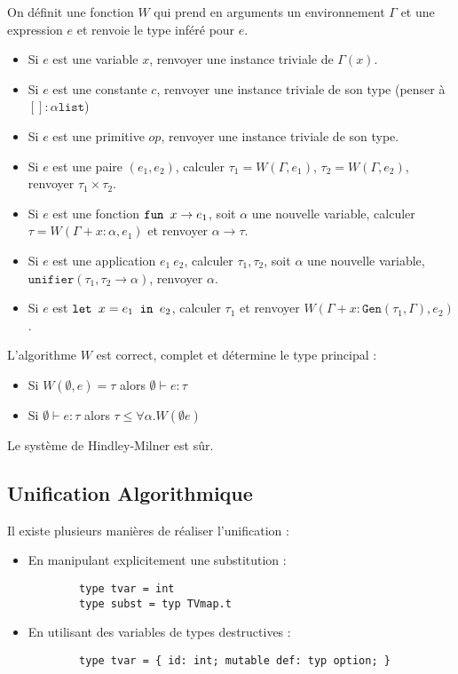 \documentclass{cours}
\begin{document}
On définit une fonction $W$ qui prend en arguments un environnement $\Gamma$ et une expression $e$ et renvoie le type inféré pour $e$.
\begin{itemize}
    \item Si $e$ est une variable $x$, renvoyer une instance triviale de $\Gamma(x)$.
    \item Si $e$ est une constante $c$, renvoyer une instance triviale de son type (penser à $\left[\right] : \alpha \texttt{list}$)
    \item Si $e$ est une primitive $op$, renvoyer une instance triviale de son type.
    \item Si $e$ est une paire $(e_{1}, e_{2})$, calculer $\tau_{1} = W(\Gamma, e_{1})$, $\tau_{2} = W\left(\Gamma, e_{2}\right)$, renvoyer $\tau_{1} \times \tau_{2}$.
    \item Si $e$ est une fonction $\texttt{fun } x \rightarrow e_{1}$, soit $\alpha$ une nouvelle variable, calculer $\tau = W(\Gamma + x : \alpha, e_{1})$ et renvoyer $\alpha \rightarrow \tau$.
    \item Si $e$ est une application $e_{1} \ e_{2}$, calculer $\tau_{1}, \tau_{2}$, soit $\alpha$ une nouvelle variable,  $\texttt{unifier}(\tau_{1}, \tau_{2} \rightarrow \alpha)$, renvoyer $\alpha$.
    \item Si $e$ est $\texttt{let } x = e_{1} \texttt{ in } e_{2}$, calculer $\tau_{1}$ et renvoyer $W(\Gamma + x : \texttt{Gen}(\tau_{1}, \Gamma), e_{2})$.
\end{itemize}

\begin{theorem}
    L'algorithme $W$ est correct, complet et détermine le type principal :
    \begin{itemize}
        \item Si $W(\emptyset, e) = \tau$ alors $\emptyset \vdash e : \tau$
        \item Si $\emptyset \vdash e : \tau$ alors $\tau \leq \forall \alpha.W(\emptyset e)$
    \end{itemize}
\end{theorem}

\begin{theorem}
    Le système de Hindley-Milner est sûr.
\end{theorem}

\subsection{Unification Algorithmique}
Il existe plusieurs manières de réaliser l'unification :
\begin{itemize}
    \item En manipulant explicitement une substitution :
          \begin{verbatim}
        type tvar = int
        type subst = typ TVmap.t
    \end{verbatim}
    \item En utilisant des variables de types destructives :
          \begin{verbatim}
        type tvar = { id: int; mutable def: typ option; }
    \end{verbatim}
\end{itemize}
\end{document}
